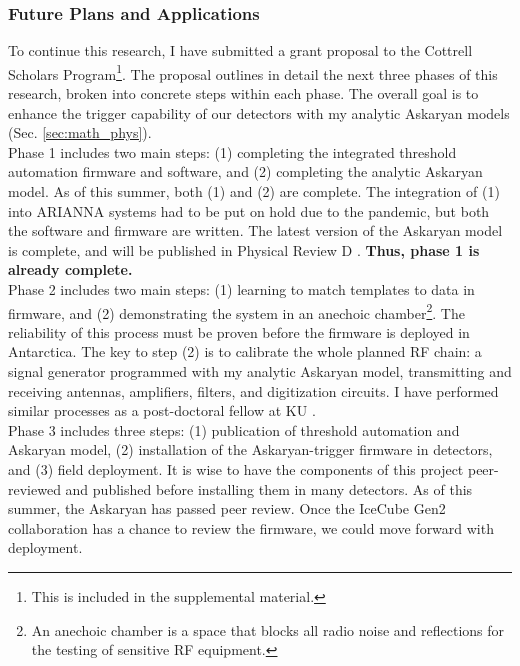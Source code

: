 \documentclass[../../../main.tex]{subfiles}
\begin{document}
\subsubsection{Future Plans and Applications}

To continue this research, I have submitted a grant proposal to the Cottrell Scholars Program\footnote{This is included in the supplemental material.}.  The proposal outlines in detail the next three phases of this research, broken into concrete steps within each phase.  The overall goal is to enhance the trigger capability of our detectors with my analytic Askaryan models (Sec. \ref{sec:math_phys}).
\\
\vspace{0.25cm}
Phase 1 includes two main steps: (1) completing the integrated threshold automation firmware and software, and (2) completing the analytic Askaryan model.  As of this summer, both (1) and (2) are complete.  The integration of (1) into ARIANNA systems had to be put on hold due to the pandemic, but both the software and firmware are written.  The latest version of the Askaryan model is complete, and will be published in Physical Review D \cite{time}.  \textbf{Thus, phase 1 is already complete.}
\\
\vspace{0.25cm}
Phase 2 includes two main steps: (1) learning to match templates to data in firmware, and (2) demonstrating the system in an anechoic chamber\footnote{An anechoic chamber is a space that blocks all radio noise and reflections for the testing of sensitive RF equipment.}.  The reliability of this process must be proven before the firmware is deployed in Antarctica.  The key to step (2) is to calibrate the whole planned RF chain: a signal generator programmed with my analytic Askaryan model, transmitting and receiving antennas, amplifiers, filters, and digitization circuits.  I have performed similar processes as a post-doctoral fellow at KU \cite{10.1016/j.astropartphys.2014.09.002}.
\\
\vspace{0.25cm}
Phase 3 includes three steps: (1) publication of threshold automation and Askaryan model, (2) installation of the Askaryan-trigger firmware in detectors, and (3) field deployment.  It is wise to have the components of this project peer-reviewed and published before installing them in many detectors.  As of this summer, the Askaryan has passed peer review.  Once the IceCube Gen2 collaboration has a chance to review the firmware, we could move forward with deployment.
\end{document}
